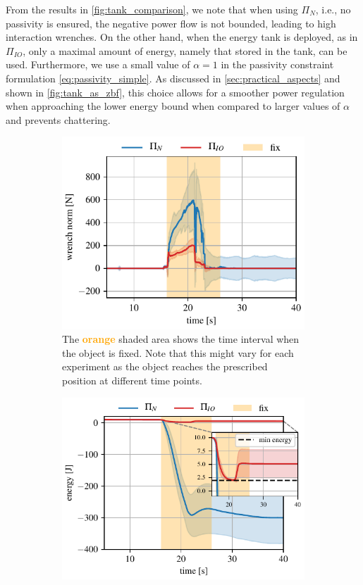 From the results in \fig \ref{fig:tank_comparison}, we note that when using $\Pi_{N}$, i.e., no passivity is ensured, the negative power flow is not bounded, leading to high interaction wrenches. On the other hand, when the energy tank is deployed, as in $\Pi_{IO}$, only a maximal amount of energy, namely that stored in the tank, can be used. Furthermore, we use a small value of $\alpha=1$ in the passivity constraint formulation \eqref{eq:passivity_simple}. As discussed in \sect \ref{sec:practical_aspects} and shown in \fig \ref{fig:tank_as_zbf}, this choice allows for a smoother power regulation when approaching the lower energy bound when compared to larger values of $\alpha$ and prevents chattering. 

\begin{figure}[t]
\centering
\begin{subfigure}{\columnwidth}
\centering
    \includegraphics[width=0.8\linewidth]{figures/fix_experiment/wrench_with_without_tank.pdf}
    \caption{The  \textcolor{orange}{\textbf{orange}} shaded area shows the time interval when the object is fixed. Note that this might vary for each experiment as the object reaches the prescribed position at different time points.}
\end{subfigure}
\begin{subfigure}{\columnwidth}
\centering
    \includegraphics[width=0.8\linewidth]{figures/fix_experiment/energy_with_without_tank.pdf}

\end{subfigure}
\end{figure}
